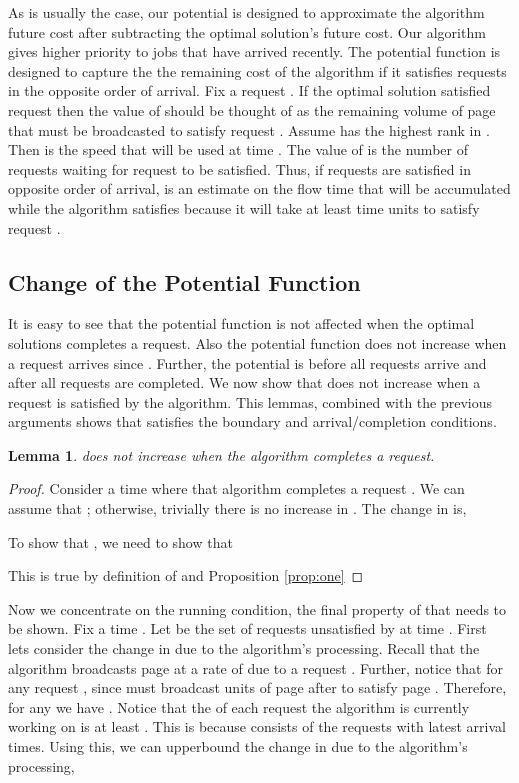 \documentclass[11pt]{article}
\newtheorem{lemma}{Lemma}[section]
\begin{document}
As is usually the case, our potential is designed to approximate the algorithm future cost after subtracting the optimal solution's future cost.    Our algorithm gives higher priority to jobs that have arrived recently.  The potential function is designed to capture the the remaining cost of the algorithm if it satisfies requests in the opposite order of arrival.    Fix a request .  If the optimal solution satisfied request  then the value of  should be thought of as the remaining volume of page  that must be broadcasted to satisfy request .  Assume  has the highest rank in . Then  is the speed that will be used at time .  The value of  is the number of requests waiting for request  to be satisfied. Thus,  if requests are satisfied in opposite order of arrival,  is an estimate on the flow time that will be accumulated while the algorithm satisfies  because it will take at least  time units to satisfy request .

\subsection{Change of the Potential Function}


It is easy to see that the potential function is not affected when the optimal solutions completes a request. Also the potential function does not increase when a request  arrives since . Further, the potential is  before all requests arrive and after all requests are completed.  We now show that  does not increase when a request is satisfied by the algorithm.  This lemmas, combined with the previous arguments shows that  satisfies the boundary and arrival/completion conditions.

\begin{lemma}
\label{lem:comp}
 does not increase when the algorithm completes a request.
\end{lemma}
\begin{proof}

Consider a time  where that algorithm completes a request .   We can assume that ; otherwise, trivially there is no increase in .   The change in  is,




To show that , we need to show that 



This is true by definition of  and Proposition \ref{prop:one}
\end{proof}



Now we concentrate on the running condition, the final property of  that needs to be shown.   Fix a time .  Let  be the set of requests unsatisfied by  at time .  First lets consider the change in  due to the algorithm's processing.   Recall that the algorithm broadcasts page  at a rate of  due to a request .  Further, notice that  for any request , since  must broadcast  units of page  after  to satisfy page .  Therefore, for any  we have . Notice that the  of each request the algorithm  is currently working on is at least .  This is because  consists of the  requests with latest arrival times.  Using this, we can upperbound the change in  due to the algorithm's processing,
\end{document}
